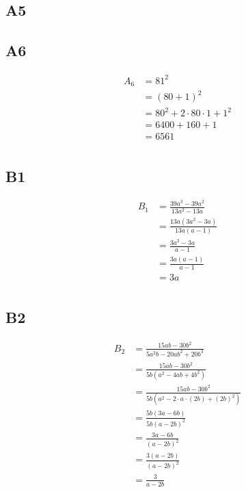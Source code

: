 \documentclass[]{article}
\begin{document}
\subsection*{A5}
\par
\subsection*{A6}
\begin{align*}
	&& A_6 &= 81^2 &&\\
	&&  &= (80+1)^2 &&\\
	&&  &= 80^2 + 2 \cdot 80 \cdot 1 + 1^2 &&\\
	&&  &= 6400 + 160 + 1 &&\\
	&&  &= 6561 &&\\
\end{align*}


\subsection*{B1}
\begin{align*}
	&& B_1 &= \frac{39a^3-39a^2}{13a^2-13a} &&\\
	&& &= \frac{13a(3a^2-3a)}{13a(a-1)} &&\\
	&& &= \frac{3a^2-3a}{a-1} &&\\
	&& &= \frac{3a(a-1)}{a-1} &&\\
	&& &= 3a &&\\
\end{align*}

\subsection*{B2}
\begin{align*}
	&& B_2 &= \frac{15ab-30b^2}{5a^2b-20ab^2+20b^3} &&\\
	&& &= \frac{15ab-30b^2}{5b(a^2-4ab+4b^2)} &&\\
	&& &= \frac{15ab-30b^2}{5b(a^2-2\cdot a \cdot (2b)+(2b)^2)} &&\\
	&& &= \frac{5b(3a-6b)}{5b(a-2b)^2} &&\\
	&& &= \frac{3a-6b}{(a-2b)^2} &&\\
	&& &= \frac{3(a-2b)}{(a-2b)^2} &&\\
	&& &= \frac{3}{a-2b} &&\\
\end{align*}
\end{document}
